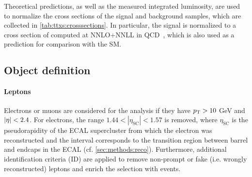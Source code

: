 Theoretical predictions, as well as the measured integrated luminosity, are used to normalize the cross sections of the signal and background samples, which are collected in \cref{tab:ttxs:crosssections}. In particular, the \ttbar signal is normalized to a cross section of \xsecpred computed at NNLO+NNLL in QCD~\cite{Czakon:2011xx}, which is also used as a prediction for comparison with the SM.

\subsection{Object definition}
\label{sec:ttxs:objects}

\paragraph{Leptons}

Electrons or muons are considered for the analysis if they have $p_{\mathrm{T}} > 10$ GeV and $|\eta| < 2.4$. For electrons, the range $1.44 < |\eta_{\mathrm{SC}}| < 1.57$ is removed, where $\eta_{\mathrm{SC}}$ is the pseudorapidity of the ECAL supercluster from which the electron was reconstructed and the interval corresponds to the transition region between barrel and endcaps in the ECAL (cf. \cref{sec:methods:reco}). Furthermore, additional identification criteria (ID) are applied to remove non-prompt or fake (i.e. wrongly reconstructed) leptons and enrich the selection with \ttbar events.

